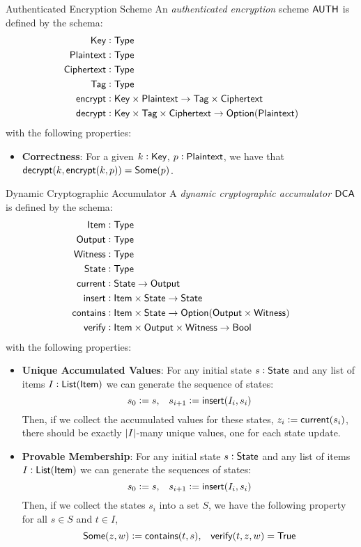 \begin{definitiontoc}{Authenticated Encryption Scheme}
    An \emph{authenticated encryption} scheme ${\textsf{AUTH}}$ is defined by the schema:
    \begin{align*}
        {\textsf{Key}}        &: {\textsf{Type}} \\
        {\textsf{Plaintext}}  &: {\textsf{Type}} \\
        {\textsf{Ciphertext}} &: {\textsf{Type}} \\
        {\textsf{Tag}}        &: {\textsf{Type}} \\
        {\textsf{encrypt}}    &: {\textsf{Key}} \times {\textsf{Plaintext}} \to {\textsf{Tag}} \times {\textsf{Ciphertext}} \\
        {\textsf{decrypt}}    &: {\textsf{Key}} \times {\textsf{Tag}} \times {\textsf{Ciphertext}} \to {\textsf{Option}}({\textsf{Plaintext}})
    \end{align*}
    with the following properties:
    \begin{itemize}
        \item \textbf{Correctness}: For a given $k : {\textsf{Key}}$, $p : {\textsf{Plaintext}}$, we have that ${\textsf{decrypt}}(k, {\textsf{encrypt}}(k, p)) = {\textsf{Some}}(p)$.
    \end{itemize}
\end{definitiontoc}

\begin{definitiontoc}{Dynamic Cryptographic Accumulator}
    A \emph{dynamic cryptographic accumulator} ${\textsf{DCA}}$ is defined by the schema:
    \begin{align*}
        {\textsf{Item}}     &: {\textsf{Type}} \\
        {\textsf{Output}}   &: {\textsf{Type}} \\
        {\textsf{Witness}}  &: {\textsf{Type}} \\
        {\textsf{State}}   &: {\textsf{Type}} \\
        {\textsf{current}}  &: {\textsf{State}} \to {\textsf{Output}} \\
        {\textsf{insert}}  &: {\textsf{Item}} \times {\textsf{State}} \to {\textsf{State}} \\
        {\textsf{contains}} &: {\textsf{Item}} \times {\textsf{State}} \to {\textsf{Option}}({\textsf{Output}} \times {\textsf{Witness}}) \\
        {\textsf{verify}}   &: {\textsf{Item}} \times {\textsf{Output}} \times {\textsf{Witness}} \to {\textsf{Bool}}
    \end{align*}
    with the following properties:
    \begin{itemize}
        \item \textbf{Unique Accumulated Values}: For any initial state $s : {\textsf{State}}$ and any list of items $I : {\textsf{List}}({\textsf{Item}})$ we can generate the sequence of states:
            \[s_0 := s, \,\,\,\,\, s_{i + 1} := {\textsf{insert}}(I_i, s_i)\]
            Then, if we collect the accumulated values for these states, $z_i := {\textsf{current}}(s_i)$, there should be exactly $\left|I\right|$-many unique values, one for each state update.
        \item \textbf{Provable Membership}: For any initial state $s : {\textsf{State}}$ and any list of items $I : {\textsf{List}}({\textsf{Item}})$ we can generate the sequences of states:
            \[s_0 := s, \,\,\,\,\, s_{i + 1} := {\textsf{insert}}(I_i, s_i)\]
            Then, if we collect the states $s_i$ into a set $S$, we have the following property for all $s \in S$ and $t \in I$,
            \[{\textsf{Some}}(z, w) := {\textsf{contains}}(t, s), \,\,\,\,\, {\textsf{verify}}(t, z, w) = {\textsf{True}}\]
    \end{itemize}
\end{definitiontoc}

